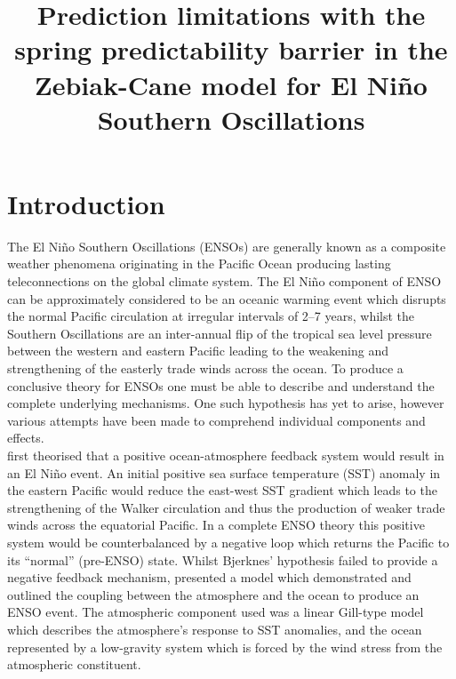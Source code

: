 \documentclass[12pt, onecolumn]{revtex4}    %
\begin{document}
                     

\title{Prediction limitations with the spring predictability barrier in the Zebiak-Cane model for El Ni\~{n}o Southern Oscillations} 

\maketitle
\thispagestyle{plain} %

\section{Introduction}
The El Ni\~{n}o Southern Oscillations (ENSOs) are generally known as a composite weather phenomena originating in the Pacific Ocean producing lasting teleconnections on the global climate system. The El Ni\~{n}o component of ENSO can be approximately considered to be an oceanic warming event which disrupts the normal Pacific circulation at irregular intervals of 2--7 years, whilst the Southern Oscillations are an inter-annual flip of the tropical sea level pressure between the western and eastern Pacific leading to the weakening and strengthening of the easterly trade winds across the ocean. To produce a conclusive theory for ENSOs one must be able to describe and understand the complete underlying mechanisms. One such hypothesis has yet to arise, however various attempts have been made to comprehend individual components and effects. \\

\cite{doi:10.1175/1520-04931969097} first theorised that a positive ocean-atmosphere feedback system would result in an El Ni\~{n}o event. An initial positive sea surface temperature (SST) anomaly in the eastern Pacific would reduce the east-west SST gradient which leads to the strengthening of the Walker circulation and thus the production of weaker trade winds across the equatorial Pacific. In a complete ENSO theory this positive system would be counterbalanced by a negative loop which returns the Pacific to its ``normal'' (pre-ENSO) state. Whilst Bjerknes' hypothesis failed to provide a negative feedback mechanism, \cite{Zebiak:1987aa} presented a model which demonstrated and outlined the coupling between the atmosphere and the ocean to produce an ENSO event. The atmospheric component used was a linear Gill-type model \citep{Gill:1980aa} which describes the atmosphere's response to SST anomalies, and the ocean represented by a low-gravity system which is forced by the wind stress from the atmospheric constituent. \\
\end{document}
